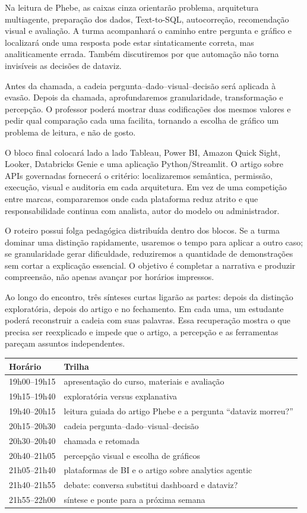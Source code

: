 Na leitura de Phebe, as caixas cinza orientarão problema, arquitetura multiagente, preparação dos dados, Text-to-SQL, autocorreção, recomendação visual e avaliação. A turma acompanhará o caminho entre pergunta e gráfico e localizará onde uma resposta pode estar sintaticamente correta, mas analiticamente errada. Também discutiremos por que automação não torna invisíveis as decisões de dataviz.

Antes da chamada, a cadeia pergunta--dado--visual--decisão será aplicada à evasão. Depois da chamada, aprofundaremos granularidade, transformação e percepção. O professor poderá mostrar duas codificações dos mesmos valores e pedir qual comparação cada uma facilita, tornando a escolha de gráfico um problema de leitura, e não de gosto.

O bloco final colocará lado a lado Tableau, Power BI, Amazon Quick Sight, Looker, Databricks Genie e uma aplicação Python/Streamlit. O artigo sobre APIs governadas fornecerá o critério: localizaremos semântica, permissão, execução, visual e auditoria em cada arquitetura. Em vez de uma competição entre marcas, compararemos onde cada plataforma reduz atrito e que responsabilidade continua com analista, autor do modelo ou administrador.

O roteiro possui folga pedagógica distribuída dentro dos blocos. Se a turma dominar uma distinção rapidamente, usaremos o tempo para aplicar a outro caso; se granularidade gerar dificuldade, reduziremos a quantidade de demonstrações sem cortar a explicação essencial. O objetivo é completar a narrativa e produzir compreensão, não apenas avançar por horários impressos.

Ao longo do encontro, três sínteses curtas ligarão as partes: depois da distinção exploratória, depois do artigo e no fechamento. Em cada uma, um estudante poderá reconstruir a cadeia com suas palavras. Essa recuperação mostra o que precisa ser reexplicado e impede que o artigo, a percepção e as ferramentas pareçam assuntos independentes.

\noindent\begin{tabularx}{\textwidth}{@{}p{2.8cm}Y@{}}
\toprule
\textbf{Horário} & \textbf{Trilha} \\
\midrule
19h00--19h15 & apresentação do curso, materiais e avaliação \\
19h15--19h40 & exploratória versus explanativa \\
19h40--20h15 & leitura guiada do artigo Phebe e a pergunta ``dataviz morreu?'' \\
20h15--20h30 & cadeia pergunta--dado--visual--decisão \\
20h30--20h40 & chamada e retomada \\
20h40--21h05 & percepção visual e escolha de gráficos \\
21h05--21h40 & plataformas de BI e o artigo sobre analytics agentic \\
21h40--21h55 & debate: conversa substitui dashboard e dataviz? \\
21h55--22h00 & síntese e ponte para a próxima semana \\
\bottomrule
\end{tabularx}


